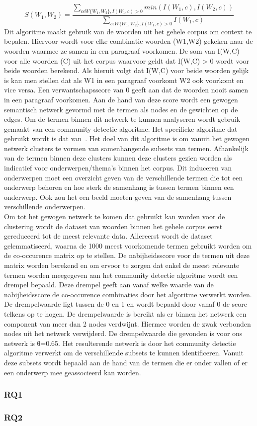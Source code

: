  $$S(W_1,W_2)=\frac{\sum_{c\epsilon W\{W_1,W_2\},I(W_1,c)>0}min(I(W_1,c),I(W_2,c))}{\sum_{c\epsilon W\{W_1,W_2\},I(W_1,c)>0}I(W_1,c)}$$ Dit algoritme maakt gebruik van de woorden uit het gehele corpus om context te bepalen. Hiervoor wordt voor elke combinatie woorden (W1,W2) gekeken naar de woorden waarmee ze
samen in een paragraaf voorkomen. De som van I(W,C) voor alle woorden (C) uit het corpus waarvoor geldt dat I(W,C) > 0 wordt voor beide woorden berekend. Als hieruit volgt dat I(W,C) voor beide woorden gelijk is kan men stellen dat als W1 in een paragraaf voorkomt W2 ook voorkomt en vice versa. Een verwantschapsscore van 0 geeft aan dat de woorden nooit samen in een paragraaf voorkomen. Aan de hand van deze score wordt een gewogen semantisch netwerk gevormd met de termen als nodes en de gewichten op de edges. Om de termen binnen dit netwerk te kunnen analyseren wordt gebruik gemaakt van een community detectie algoritme. Het specifieke algoritme dat gebruikt wordt is dat van~\cite{blondel2008fast}. Het doel van dit algoritme is om vanuit het gewogen netwerk clusters te vormen van samenhangende subsets van termen. Afhankelijk van de termen binnen deze
clusters kunnen deze clusters gezien worden als indicatief voor onderwerpen/thema's binnen het corpus. Dit induceren van onderwerpen moet een overzicht geven van de verschillende termen die tot  een onderwerp behoren en hoe sterk de samenhang is tussen termen binnen een onderwerp. Ook zou het een beeld moeten geven van de samenhang tussen verschillende onderwerpen. 
\\
Om tot het gewogen netwerk te komen dat gebruikt kan worden voor de clustering wordt de dataset van woorden binnen het gehele corpus eerst gereduceerd tot de meest relevante data. Allereerst wordt de dataset gelemmatiseerd, waarna de 1000 meest voorkomende termen gebruikt worden om de co-occurence matrix op te stellen. De nabijheidsscore voor de termen uit deze matrix worden berekend en om ervoor te zorgen dat enkel de meest relevante termen worden meegegeven aan het community detectie algoritme wordt een drempel bepaald. Deze drempel geeft aan vanaf welke waarde van de nabijheidsscore de co-occurence combinaties door het algoritme verwerkt worden. De drempelwaarde ligt tussen de 0 en 1 en wordt bepaald door vanaf 0 de score telkens op te hogen. De drempelwaarde is bereikt als er binnen het netwerk een component van meer dan 2 nodes verdwijnt. Hiermee worden de zwak verbonden nodes uit het netwerk verwijderd. De drempelwaarde die gevonden is voor ons netwerk is θ=0.65. Het resulterende netwerk is door het community detectie algoritme verwerkt om de verschillende subsets te kunnen identificeren. Vanuit deze subsets wordt bepaald aan de hand van de termen die er onder vallen of er een onderwerp mee geassocieerd kan worden.


\subsubsection{RQ1}

\subsubsection{RQ2}